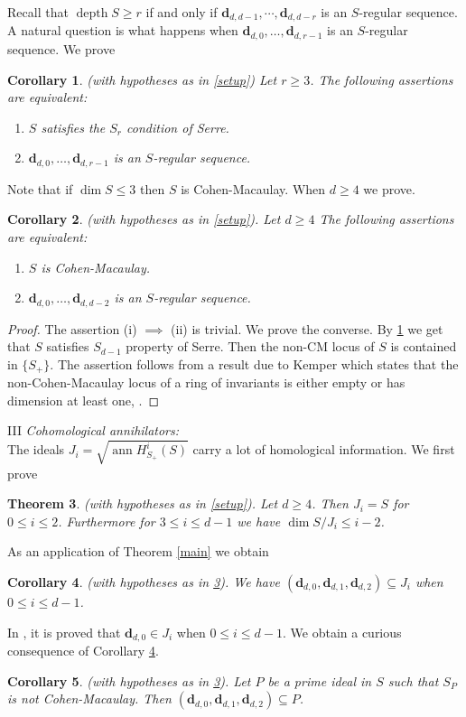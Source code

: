 \documentclass{amsart}
\newcommand{\CM}{Cohen-Macaulay}
\newcommand{\db}{\mathbf{d} }
\newcommand{\depth}{\operatorname{depth}}
\newcommand{\ann}{\operatorname{ann}}
\theoremstyle{plain}
\newtheorem{theorem}{Theorem}[section]
\newtheorem{corollary}[theorem]{Corollary}
\theoremstyle{definition}
\theoremstyle{remark}
\begin{document}
Recall that  $\depth S \geq r$ if and only if $\db_{d,d-1}, \cdots, \db_{d, d-r}$ is an $S$-regular sequence. A natural question is what happens when
$\db_{d,0}, \ldots, \db_{d, r-1}$ is an $S$-regular sequence.
We prove
\begin{corollary}
\label{sr-cor} (with hypotheses as in \ref{setup}) Let $r \geq 3$. The following assertions are equivalent:
\begin{enumerate}[\rm (i)]
  \item $S$ satisfies the $S_r$ condition of Serre.
  \item $\db_{d,0}, \ldots, \db_{d, r-1}$ is an $S$-regular sequence.
\end{enumerate}
\end{corollary}
Note that if $\dim S \leq 3$ then $S$ is \CM. When $d \geq 4$
 we prove.
\begin{corollary}
\label{cm-cor} (with hypotheses as in \ref{setup}). Let $d \geq 4$  The following assertions are equivalent:
\begin{enumerate}[\rm (i)]
  \item $S$ is \CM.
  \item $\db_{d,0}, \ldots, \db_{d, d-2}$ is an $S$-regular sequence.
\end{enumerate}
\end{corollary}
\begin{proof}
The assertion (i) $\implies$ (ii) is trivial. We prove the converse. By \ref{sr-cor} we get that $S$ satisfies $S_{d-1}$ property of Serre.  Then the non-CM locus of $S$ is contained in $\{S_+\}$. The assertion follows from a result due to Kemper which states that the non-Cohen-Macaulay locus of a ring of invariants is either empty or has dimension at least one, \cite[3.1]{K}.
\end{proof}




III \emph{Cohomological annihilators:}\\
The ideals $J_i = \sqrt{\ann H^i_{S_+}(S)}$  carry a lot of homological information. We first prove
\begin{theorem}\label{coho-ann}(with hypotheses as in \ref{setup}). Let $d \geq 4$. Then $J_i = S$ for $0 \leq i \leq 2$. Furthermore for $3 \leq i \leq d - 1$ we have
$\dim S/J_i \leq i - 2$.
\end{theorem}
As an application of Theorem \ref{main} we obtain
\begin{corollary}
\label{ann-coho-cor}(with hypotheses as in \ref{coho-ann}). We have $(\db_{d,0}, \db_{d, 1}, \db_{d,2}) \subseteq J_i$ when $0 \leq i \leq d-1$.
\end{corollary}
In \cite{P}, it is  proved that $\db_{d,0} \in J_i$ when $0 \leq i \leq d-1$. We obtain a curious consequence of Corollary \ref{ann-coho-cor}.
\begin{corollary}\label{khy}
(with hypotheses as in \ref{coho-ann}). Let $P$ be a   prime ideal in $S$ such that $S_P$ is not \CM. Then $(\db_{d,0}, \db_{d, 1}, \db_{d,2}) \subseteq P$.
\end{corollary}
\end{document}
